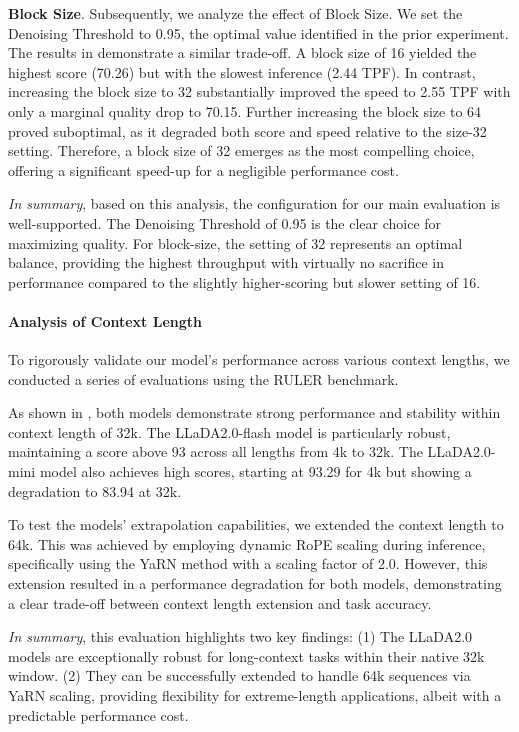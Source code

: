 \textbf{Block Size}. Subsequently, we analyze the effect of Block Size. We set the Denoising Threshold to 0.95, the optimal value identified in the prior experiment. The results in  demonstrate a similar trade-off. A block size of 16 yielded the highest score (70.26) but with the slowest inference (2.44 TPF). In contrast, increasing the block size to 32 substantially improved the speed to 2.55 TPF with only a marginal quality drop to 70.15. Further increasing the block size to 64 proved suboptimal, as it degraded both score and speed relative to the size-32 setting. Therefore, a block size of 32 emerges as the most compelling choice, offering a significant speed-up for a negligible performance cost.

\textit{In summary}, based on this analysis, the configuration for our main evaluation is well-supported. The Denoising Threshold of 0.95 is the clear choice for maximizing quality. For block-size, the setting of 32 represents an optimal balance, providing the highest throughput with virtually no sacrifice in performance compared to the slightly higher-scoring but slower setting of 16.

\paragraph{Analysis of Context Length}

To rigorously validate our model's performance across various context lengths, we conducted a series of evaluations using the RULER benchmark.

As shown in , both models demonstrate strong performance and stability within context length of 32k. The LLaDA2.0-flash model is particularly robust, maintaining a score above 93 across all lengths from 4k to 32k. The LLaDA2.0-mini model also achieves high scores, starting at 93.29 for 4k but showing a degradation to 83.94 at 32k.

To test the models' extrapolation capabilities, we extended the context length to 64k. This was achieved by employing dynamic RoPE scaling during inference, specifically using the YaRN method with a scaling factor of 2.0. However, this extension resulted in a performance degradation for both models, demonstrating a clear trade-off between context length extension and task accuracy.

\textit{In summary}, this evaluation highlights two key findings: (1) The LLaDA2.0 models are exceptionally robust for long-context tasks within their native 32k window. (2) They can be successfully extended to handle 64k sequences via YaRN scaling, providing flexibility for extreme-length applications, albeit with a predictable performance cost.